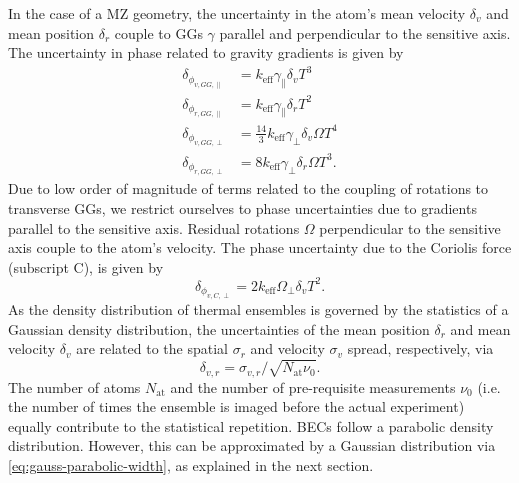 In the case of a MZ geometry, the uncertainty in the atom's mean velocity $\delta_v$ and mean position $\delta_r$ couple to GGs $\gamma$ parallel and perpendicular to the sensitive axis. The uncertainty in phase related to gravity gradients is given by
\begin{align}
    \label{eq:GGparallel}
    \delta_{\phi_{v,GG,{\parallel}}}&=k_\text{eff} \gamma_\parallel \delta_v T^3\\
    \delta_{\phi_{r,GG,{\parallel}}}&=k_\text{eff} \gamma_\parallel \delta_r T^2\\
    \label{eq:GGperp}
    \delta_{\phi_{v,GG,{\perp}}}&=\tfrac{14}{3} k_\text{eff} \gamma_\perp \delta_v \Omega T^4\\
    \delta_{\phi_{r,GG,{\perp}}}&=8 k_\text{eff} \gamma_\perp \delta_r \Omega T^3.
\end{align}
Due to low order of magnitude of terms related to the coupling of rotations to transverse GGs, we restrict ourselves to phase uncertainties due to gradients parallel to the sensitive axis. Residual rotations $\Omega$ perpendicular to the sensitive axis couple to the atom's velocity.
The phase uncertainty due to the Coriolis force (subscript C), is given by
\begin{equation}
    \label{eq:Rotations}
        \delta_{\phi_{v,C,{\perp}}}=2 k_\text{eff} \Omega_\perp \delta_v T^2.
\end{equation}
As the density distribution of thermal ensembles is governed by the statistics of a Gaussian density distribution, the uncertainties of the mean position $\delta_r$ and mean velocity $\delta_v$ are related to the spatial $\sigma_r$ and velocity $\sigma_v$ spread, respectively, via
\begin{equation}\label{eq:delta-sigma-relation}
    \delta_{v,r}=\sigma_{v,r}/\sqrt{N_\text{at}\nu_0}.
\end{equation}
The number of atoms $N_\text{at}$ and the number of pre-requisite measurements $\nu_0$ (i.e. the number of times the ensemble is imaged before the actual experiment) equally contribute to the statistical repetition. BECs follow a parabolic density distribution. However, this can be approximated by a Gaussian distribution via \autoref{eq:gauss-parabolic-width}, as explained in the next section.
%
